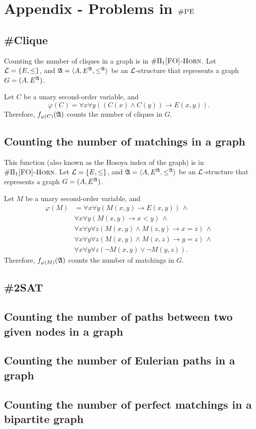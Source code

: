 \section{Appendix - Problems in $\textsc{\#PE}$}

\subsection{\#Clique}
Counting the number of cliques in a graph is in $\#\Pi_{1}\textsc{[FO]-Horn}$. Let ${\cal L} = \{E,\leq\}$, and ${\frak A} = \langle A, E^{{\frak A}}, \leq^{{\frak A}} \rangle$ be an ${\cal L}$-structure that represents a graph $G = (A,E^{{\frak A}})$.

Let $C$ be a unary second-order variable, and
\[
\varphi(C) = \forall x \forall y((C(x)\wedge C(y))\to E(x,y)).
\]
Therefore, $f_{\varphi(C)}({\frak A})$ counts the number of cliques in $G$.

\subsection{Counting the number of matchings in a graph}
This function (also known as the Hosoya index of the graph) is in $\#\Pi_{1}\textsc{[FO]-Horn}$. Let ${\cal L} = \{E,\leq\}$, and ${\frak A} = \langle A, E^{{\frak A}}, \leq^{{\frak A}} \rangle$ be an ${\cal L}$-structure that represents a graph $G = (A,E^{{\frak A}})$.

Let $M$ be a unary second-order variable, and
\begin{align*}
\varphi(M) &= \forall x \forall y (M(x,y)\to E(x,y))\,\wedge \\
& \forall x \forall y (M(x,y)\to x < y)\,\wedge \\
& \forall x \forall y \forall z(M(x,y)\wedge M(z,y) \to x = z)\,\wedge \\
& \forall x \forall y \forall z(M(x,y)\wedge M(x,z) \to y = z)\,\wedge \\
& \forall x \forall y \forall z(\neg M(x,y)\vee \neg M(y,z)).
\end{align*}
Therefore, $f_{\varphi(M)}({\frak A})$ counts the number of matchings in $G$.
\subsection{\#2SAT}

\subsection{Counting the number of paths between two given nodes in a graph}

\subsection{Counting the number of Eulerian paths in a graph}

\subsection{Counting the number of perfect matchings in a bipartite graph}